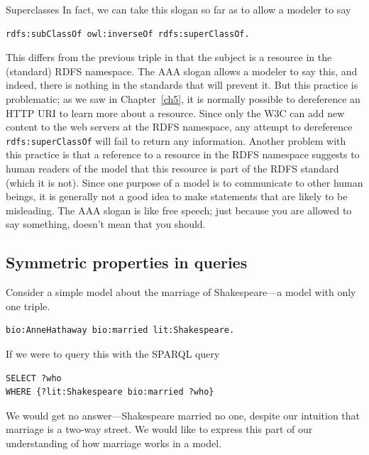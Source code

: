 \begin{challenge}{Superclasses}
In fact, we can take this slogan so far as to allow a modeler to say

\begin{lstlisting}
rdfs:subClassOf owl:inverseOf rdfs:superClassOf.
\end{lstlisting}

This differs from the previous triple in that the subject is a resource
in the (standard) RDFS namespace. The AAA slogan allows a modeler to say
this,  and indeed, there is nothing in the standards that will prevent
it. But this practice is problematic; as we saw in Chapter~\ref{ch5}, it is normally possible to dereference 
an HTTP URI to learn more about a resource.  Since only the W3C can add new content to the 
web servers at the RDFS namespace, any attempt to dereference \texttt{rdfs:superClassOf} will fail to return any information. 
Another problem with this practice is that  a reference to a resource in the RDFS namespace 
suggests to human readers of the model that this resource is part of
the RDFS standard (which it is not). Since one purpose of a model is to communicate to
other human beings, it is generally not a good idea to make statements
that are likely to be misleading.   The AAA slogan is like free speech; just because you are 
allowed to say something, doesn't mean that you should. 
\end{challenge}

\subsection{Symmetric  properties in queries}

Consider a simple model about the marriage of Shakespeare---a model with
only one triple.

\begin{lstlisting}
bio:AnneHathaway bio:married lit:Shakespeare.
\end{lstlisting}

If we were to query this with the SPARQL query

\begin{lstlisting}
SELECT ?who
WHERE {?lit:Shakespeare bio:married ?who}
\end{lstlisting}

We would get no answer---Shakespeare married no one, despite our
intuition that marriage is a two-way street. We would like to express
this part of our understanding of how marriage works in a model.

